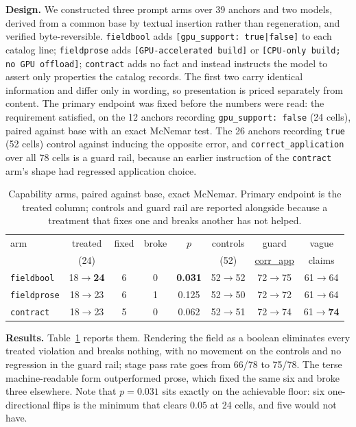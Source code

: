 \documentclass[conference]{IEEEtran}
\begin{document}
\textbf{Design.} We constructed three prompt arms over 39 anchors and two models, derived from a common base by textual insertion rather than regeneration, and verified byte-reversible. \texttt{fieldbool} adds \texttt{[gpu\_support: true|false]} to each catalog line; \texttt{fieldprose} adds \texttt{[GPU-accelerated build]} or \texttt{[CPU-only build; no GPU offload]}; \texttt{contract} adds no fact and instead instructs the model to assert only properties the catalog records. The first two carry identical information and differ only in wording, so presentation is priced separately from content. The primary endpoint was fixed before the numbers were read: the requirement satisfied, on the 12 anchors recording \texttt{gpu\_support: false} (24 cells), paired against base with an exact McNemar test. The 26 anchors recording \texttt{true} (52 cells) control against inducing the opposite error, and \texttt{correct\_application} over all 78 cells is a guard rail, because an earlier instruction of the \texttt{contract} arm's shape had regressed application choice.

\begin{table}[t]
\centering
\scriptsize
\caption{Capability arms, paired against base, exact McNemar. Primary endpoint is the treated column; controls and guard rail are reported alongside because a treatment that fixes one and breaks another has not helped.}
\label{tab:withheld}
\setlength{\tabcolsep}{3.5pt}
\begin{tabular}{lccccccc}
\toprule
arm & treated & fixed & broke & $p$ & controls & guard & vague \\
    & (24) & & & & (52) & \url{corr_app} & claims \\
\midrule
\texttt{fieldbool}  & 18$\to$\textbf{24} & 6 & 0 & \textbf{0.031} & 52$\to$52 & 72$\to$75 & 61$\to$64 \\
\texttt{fieldprose} & 18$\to$23 & 6 & 1 & 0.125 & 52$\to$50 & 72$\to$72 & 61$\to$64 \\
\texttt{contract}   & 18$\to$23 & 5 & 0 & 0.062 & 52$\to$51 & 72$\to$74 & 61$\to$\textbf{74} \\
\bottomrule
\end{tabular}
\end{table}

\textbf{Results.} Table~\ref{tab:withheld} reports them. Rendering the field as a boolean eliminates every treated violation and breaks nothing, with no movement on the controls and no regression in the guard rail; stage pass rate goes from 66/78 to 75/78. The terse machine-readable form outperformed prose, which fixed the same six and broke three elsewhere. Note that $p=0.031$ sits exactly on the achievable floor: six one-directional flips is the minimum that clears $0.05$ at 24 cells, and five would not have.
\end{document}
